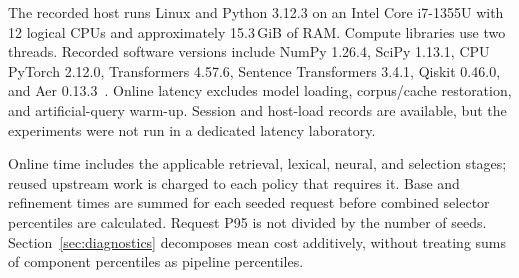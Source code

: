 The recorded host runs Linux and Python 3.12.3 on an Intel Core i7-1355U with 12 logical CPUs and approximately 15.3\,GiB of RAM. Compute libraries use two threads. Recorded software versions include NumPy 1.26.4, SciPy 1.13.1, CPU PyTorch 2.12.0, Transformers 4.57.6, Sentence Transformers 3.4.1, Qiskit 0.46.0, and Aer 0.13.3~\cite{javadi2024qiskit}. Online latency excludes model loading, corpus/cache restoration, and artificial-query warm-up. Session and host-load records are available, but the experiments were not run in a dedicated latency laboratory.

Online time includes the applicable retrieval, lexical, neural, and selection stages; reused upstream work is charged to each policy that requires it. Base and refinement times are summed for each seeded request before combined selector percentiles are calculated. Request P95 is not divided by the number of seeds. Section~\ref{sec:diagnostics} decomposes mean cost additively, without treating sums of component percentiles as pipeline percentiles.
